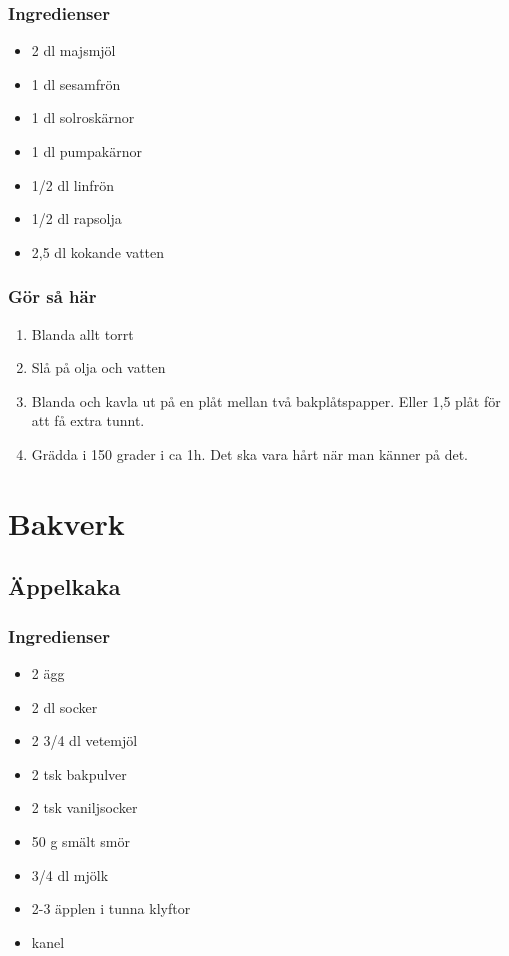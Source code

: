 \documentclass[a4paper,11pt,twocolumn]{article}
\begin{document}
\subsubsection*{Ingredienser}
\begin{itemize}[noitemsep]
    \item 2 dl majsmjöl
    \item 1 dl sesamfrön
    \item 1 dl solroskärnor
    \item 1 dl pumpakärnor
    \item 1/2 dl linfrön
    \item 1/2 dl rapsolja
    \item 2,5 dl kokande vatten
\end{itemize}
\subsubsection*{Gör så här}
\begin{enumerate}[label=\arabic*.]
    \item Blanda allt torrt
    \item Slå på olja och vatten
    \item Blanda och kavla ut på en plåt mellan två bakplåtspapper. Eller 1,5 plåt för att få extra tunnt.
    \item Grädda i 150 grader i ca 1h. Det ska vara hårt när man känner på det.
\end{enumerate}




\newpage
\section{Bakverk}




\subsection{Äppelkaka}
\subsubsection*{Ingredienser}
\begin{itemize}[noitemsep]
    \item 2 ägg
    \item 2 dl socker
    \item 2 3/4 dl vetemjöl
    \item 2 tsk bakpulver
    \item 2 tsk vaniljsocker
    \item 50 g smält smör
    \item 3/4 dl mjölk
    \item 2-3 äpplen i tunna klyftor
    \item kanel
\end{itemize}
\end{document}
